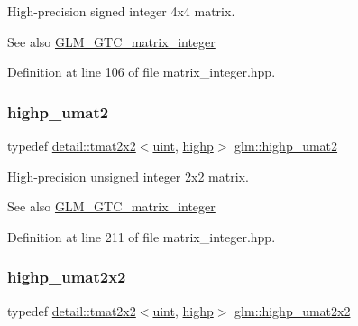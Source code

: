High-\/precision signed integer 4x4 matrix. \begin{DoxySeeAlso}{See also}
\hyperlink{group__gtc__matrix__integer}{G\+L\+M\+\_\+\+G\+T\+C\+\_\+matrix\+\_\+integer} 
\end{DoxySeeAlso}


Definition at line 106 of file matrix\+\_\+integer.\+hpp.

\mbox{\label{group__gtc__matrix__integer_ga0c89800e3f63f82da4a4159004811cec}} 
\subsubsection{\texorpdfstring{highp\+\_\+umat2}{highp\_umat2}}
{\footnotesize\ttfamily typedef \hyperlink{structglm_1_1detail_1_1tmat2x2}{detail\+::tmat2x2}$<$\hyperlink{group__core__precision_ga4fd29415871152bfb5abd588334147c8}{uint}, \hyperlink{namespaceglm_a0f04f086094c747d227af4425893f545ac6f7eab42eacbb10d59a58e95e362074}{highp}$>$ \hyperlink{group__gtc__matrix__integer_ga0c89800e3f63f82da4a4159004811cec}{glm\+::highp\+\_\+umat2}}

High-\/precision unsigned integer 2x2 matrix. \begin{DoxySeeAlso}{See also}
\hyperlink{group__gtc__matrix__integer}{G\+L\+M\+\_\+\+G\+T\+C\+\_\+matrix\+\_\+integer} 
\end{DoxySeeAlso}


Definition at line 211 of file matrix\+\_\+integer.\+hpp.

\mbox{\label{group__gtc__matrix__integer_ga428410468e33d16dc8aee08b17166669}} 
\subsubsection{\texorpdfstring{highp\+\_\+umat2x2}{highp\_umat2x2}}
{\footnotesize\ttfamily typedef \hyperlink{structglm_1_1detail_1_1tmat2x2}{detail\+::tmat2x2}$<$\hyperlink{group__core__precision_ga4fd29415871152bfb5abd588334147c8}{uint}, \hyperlink{namespaceglm_a0f04f086094c747d227af4425893f545ac6f7eab42eacbb10d59a58e95e362074}{highp}$>$ \hyperlink{group__gtc__matrix__integer_ga428410468e33d16dc8aee08b17166669}{glm\+::highp\+\_\+umat2x2}}

